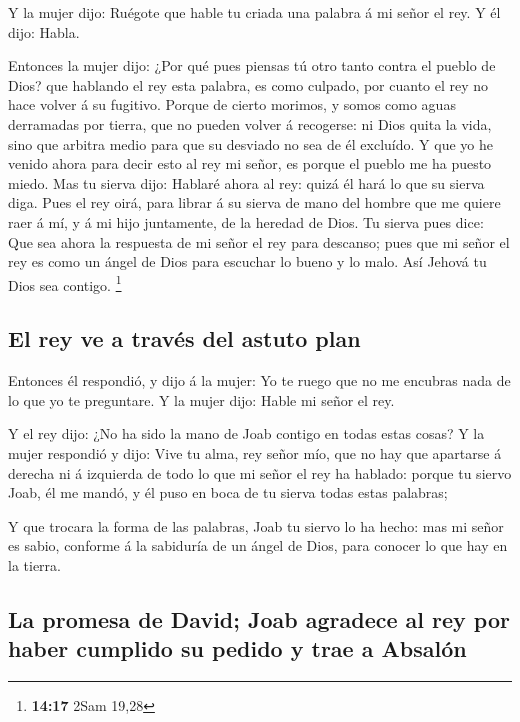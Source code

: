  Y la mujer dijo: Ruégote que hable tu criada una palabra á
mi señor el rey. Y él dijo: Habla.

 Entonces la mujer dijo: ¿Por qué pues piensas tú otro
tanto contra el pueblo de Dios? que hablando el rey esta palabra, es
como culpado, por cuanto el rey no hace volver á su fugitivo.
 Porque de cierto morimos, y somos como aguas derramadas
por tierra, que no pueden volver á recogerse: ni Dios quita la vida,
sino que arbitra medio para que su desviado no sea de él excluído.
 Y que yo he venido ahora para decir esto al rey mi señor,
es porque el pueblo me ha puesto miedo. Mas tu sierva dijo: Hablaré
ahora al rey: quizá él hará lo que su sierva diga.  Pues el
rey oirá, para librar á su sierva de mano del hombre que me quiere raer
á mí, y á mi hijo juntamente, de la heredad de Dios.  Tu
sierva pues dice: Que sea ahora la respuesta de mi señor el rey para
descanso; pues que mi señor el rey es como un ángel de Dios para
escuchar lo bueno y lo malo. Así Jehová tu Dios sea contigo. \footnote{\textbf{14:17}
  2Sam 19,28}

\hypertarget{el-rey-ve-a-travuxe9s-del-astuto-plan}{%
\subsection{El rey ve a través del astuto
plan}\label{el-rey-ve-a-travuxe9s-del-astuto-plan}}

 Entonces él respondió, y dijo á la mujer: Yo te ruego que
no me encubras nada de lo que yo te preguntare. Y la mujer dijo: Hable
mi señor el rey.

 Y el rey dijo: ¿No ha sido la mano de Joab contigo en
todas estas cosas? Y la mujer respondió y dijo: Vive tu alma, rey señor
mío, que no hay que apartarse á derecha ni á izquierda de todo lo que mi
señor el rey ha hablado: porque tu siervo Joab, él me mandó, y él puso
en boca de tu sierva todas estas palabras;

 Y que trocara la forma de las palabras, Joab tu siervo lo
ha hecho: mas mi señor es sabio, conforme á la sabiduría de un ángel de
Dios, para conocer lo que hay en la tierra.

\hypertarget{la-promesa-de-david-joab-agradece-al-rey-por-haber-cumplido-su-pedido-y-trae-a-absaluxf3n}{%
\subsection{La promesa de David; Joab agradece al rey por haber cumplido
su pedido y trae a
Absalón}\label{la-promesa-de-david-joab-agradece-al-rey-por-haber-cumplido-su-pedido-y-trae-a-absaluxf3n}}

